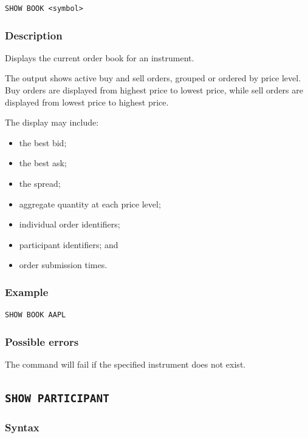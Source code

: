 \documentclass{article}
\begin{document}
\begin{lstlisting}
SHOW BOOK <symbol>
\end{lstlisting}

\subsubsection*{Description}

Displays the current order book for an instrument.

The output shows active buy and sell orders, grouped or ordered by
price level. Buy orders are displayed from highest price
to lowest price, while sell orders are displayed from lowest price
to highest price.

The display may include:

\begin{itemize}
    \item the best bid;
    \item the best ask;
    \item the spread;
    \item aggregate quantity at each price level;
    \item individual order identifiers;
    \item participant identifiers; and
    \item order submission times.
\end{itemize}

\subsubsection*{Example}

\begin{lstlisting}
SHOW BOOK AAPL
\end{lstlisting}

\subsubsection*{Possible errors}

The command will fail if the specified instrument does not exist.

\subsection{\texttt{SHOW PARTICIPANT}}

\subsubsection*{Syntax}
\end{document}
